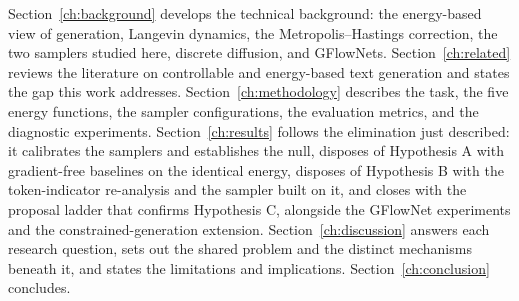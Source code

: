 Section~\ref{ch:background} develops the technical background: the energy-based view of generation, Langevin dynamics, the Metropolis--Hastings correction, the two samplers studied here, discrete diffusion, and GFlowNets. Section~\ref{ch:related} reviews the literature on controllable and energy-based text generation and states the gap this work addresses. Section~\ref{ch:methodology} describes the task, the five energy functions, the sampler configurations, the evaluation metrics, and the diagnostic experiments. Section~\ref{ch:results} follows the elimination just described: it calibrates the samplers and establishes the null, disposes of Hypothesis A with gradient-free baselines on the identical energy, disposes of Hypothesis B with the token-indicator re-analysis and the sampler built on it, and closes with the proposal ladder that confirms Hypothesis C, alongside the GFlowNet experiments and the constrained-generation extension. Section~\ref{ch:discussion} answers each research question, sets out the shared problem and the distinct mechanisms beneath it, and states the limitations and implications. Section~\ref{ch:conclusion} concludes.
